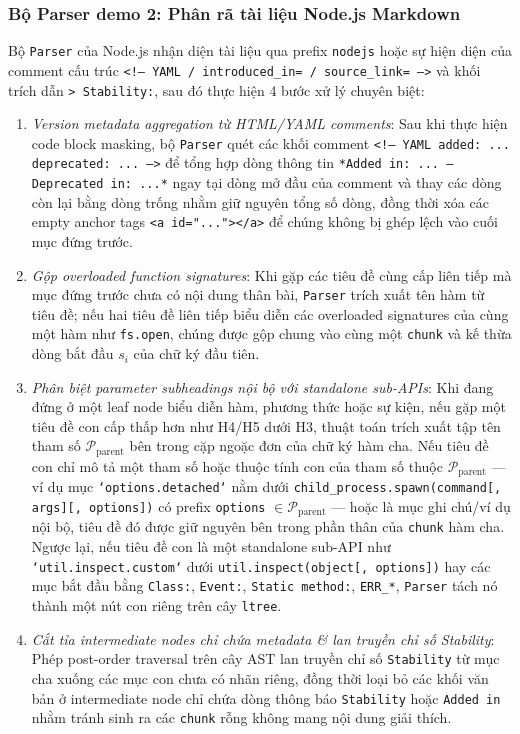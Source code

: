 \subsubsection{Bộ Parser demo 2: Phân rã tài liệu Node.js Markdown}
Bộ \texttt{Parser} của Node.js nhận diện tài liệu qua prefix \texttt{nodejs} hoặc sự hiện diện của comment cấu trúc \texttt{<!-- YAML / introduced\_in= / source\_link= -->} và khối trích dẫn \texttt{> Stability:}, sau đó thực hiện 4 bước xử lý chuyên biệt:
\begin{enumerate}
    \item \textit{Version metadata aggregation từ HTML/YAML comments}: Sau khi thực hiện code block masking, bộ \texttt{Parser} quét các khối comment \texttt{<!-- YAML added: ... deprecated: ... -->} để tổng hợp dòng thông tin \texttt{*Added in: ... --- Deprecated in: ...*} ngay tại dòng mở đầu của comment và thay các dòng còn lại bằng dòng trống nhằm giữ nguyên tổng số dòng, đồng thời xóa các empty anchor tags \texttt{<a id="..."></a>} để chúng không bị ghép lệch vào cuối mục đứng trước.
    \item \textit{Gộp overloaded function signatures}: Khi gặp các tiêu đề cùng cấp liên tiếp mà mục đứng trước chưa có nội dung thân bài, \texttt{Parser} trích xuất tên hàm từ tiêu đề; nếu hai tiêu đề liên tiếp biểu diễn các overloaded signatures của cùng một hàm như \texttt{fs.open}, chúng được gộp chung vào cùng một \texttt{chunk} và kế thừa dòng bắt đầu $s_i$ của chữ ký đầu tiên.
    \item \textit{Phân biệt parameter subheadings nội bộ với standalone sub-APIs}: Khi đang đứng ở một leaf node biểu diễn hàm, phương thức hoặc sự kiện, nếu gặp một tiêu đề con cấp thấp hơn như H4/H5 dưới H3, thuật toán trích xuất tập tên tham số $\mathcal{P}_{\text{parent}}$ bên trong cặp ngoặc đơn của chữ ký hàm cha. Nếu tiêu đề con chỉ mô tả một tham số hoặc thuộc tính con của tham số thuộc $\mathcal{P}_{\text{parent}}$ — ví dụ mục \texttt{`options.\allowbreak detached`} nằm dưới \texttt{child\_\allowbreak process.\allowbreak spawn(command[, args][, options])} có prefix \texttt{options} $\in \mathcal{P}_{\text{parent}}$ — hoặc là mục ghi chú/ví dụ nội bộ, tiêu đề đó được giữ nguyên bên trong phần thân của \texttt{chunk} hàm cha. Ngược lại, nếu tiêu đề con là một standalone sub-API như \texttt{`util.\allowbreak inspect.\allowbreak custom`} dưới \texttt{util.\allowbreak inspect(object[, options])} hay các mục bắt đầu bằng \texttt{Class:}, \texttt{Event:}, \texttt{Static method:}, \texttt{ERR\_*}, \texttt{Parser} tách nó thành một nút con riêng trên cây \texttt{ltree}.
    \item \textit{Cắt tỉa intermediate nodes chỉ chứa metadata \& lan truyền chỉ số Stability}: Phép post-order traversal trên cây AST lan truyền chỉ số \texttt{Stability} từ mục cha xuống các mục con chưa có nhãn riêng, đồng thời loại bỏ các khối văn bản ở intermediate node chỉ chứa dòng thông báo \texttt{Stability} hoặc \texttt{Added in} nhằm tránh sinh ra các \texttt{chunk} rỗng không mang nội dung giải thích.
\end{enumerate}

